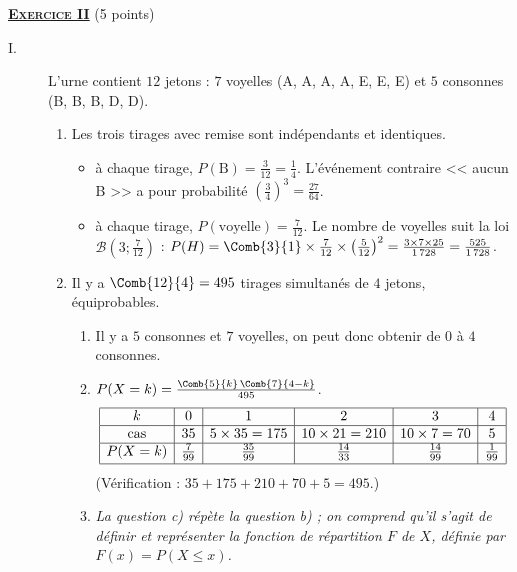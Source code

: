 \noindent \underline{\textsc{\textbf{Exercice II}}} (5 points)
	\begin{description}
		\item[I.] L'urne contient $12$ jetons : $7$ voyelles (A, A, A, A, E, E, E) et $5$ consonnes (B, B, B, D, D).
			\begin{enumerate}
				\item Les trois tirages avec remise sont indépendants et identiques.
					\begin{itemize}
						\item {} à chaque tirage, $P(\text{B}) = \frac{3}{12} = \frac{1}{4}$.
							L'événement contraire << aucun B >> a pour probabilité $\left(\frac{3}{4}\right)^3 = \frac{27}{64}$.

						\item {} à chaque tirage, $P(\text{voyelle}) = \frac{7}{12}$. Le nombre de voyelles suit la loi
							$\mathscr{B}\left(3;\frac{7}{12}\right)$ :
							$P(H) = \Comb{3}{1}\times\frac{7}{12}\times\left(\frac{5}{12}\right)^2 = \frac{3\times7\times25}{1\,728} = \frac{525}{1\,728}$.

					\end{itemize}
				\item Il y a $\Comb{12}{4} = 495$ tirages simultanés de $4$ jetons, équiprobables.
					\begin{enumerate}
						\item Il y a $5$ consonnes et $7$ voyelles, on peut donc obtenir de $0$ à $4$ consonnes.

						\item {} $P(X = k) = \frac{\Comb{5}{k}\,\Comb{7}{4-k}}{495}$.
							\[
							\begin{array}{|c|c|c|c|c|c|}
								\hline
								k & 0 & 1 & 2 & 3 & 4 \\ \hline
								\text{cas} & 35 & 5\times35 = 175 & 10\times21 = 210 & 10\times7 = 70 & 5 \\ \hline
								P(X=k) & \frac{7}{99} & \frac{35}{99} & \frac{14}{33} & \frac{14}{99} & \frac{1}{99} \\[.5ex] \hline
							\end{array}
							\]
							(Vérification : $35 + 175 + 210 + 70 + 5 = 495$.)
						\item \textit{La question c) répète la question b) ; on comprend qu'il s'agit de définir et représenter la
							\emph{fonction de répartition} $F$ de $X$, définie par $F(x) = P(X \leq x)$.}


\end{enumerate}
\end{enumerate}
\end{description}
